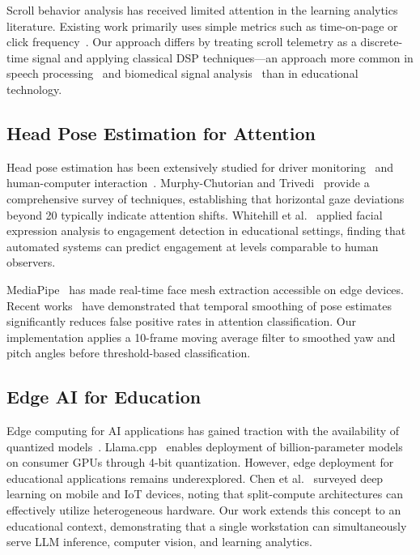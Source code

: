 \documentclass[conference]{IEEEtran}
\begin{document}
Scroll behavior analysis has received limited attention in the learning analytics literature. Existing work primarily uses simple metrics such as time-on-page or click frequency~\cite{romero2010educational}. Our approach differs by treating scroll telemetry as a discrete-time signal and applying classical DSP techniques---an approach more common in speech processing~\cite{rabiner1993} and biomedical signal analysis~\cite{rangayyan2015biomedical} than in educational technology.

\subsection{Head Pose Estimation for Attention}

Head pose estimation has been extensively studied for driver monitoring~\cite{murphy2009head} and human-computer interaction~\cite{baltrusaitis2018openface}. Murphy-Chutorian and Trivedi~\cite{murphy2009head} provide a comprehensive survey of techniques, establishing that horizontal gaze deviations beyond 20\textdegree{} typically indicate attention shifts. Whitehill et al.~\cite{whitehill2014} applied facial expression analysis to engagement detection in educational settings, finding that automated systems can predict engagement at levels comparable to human observers.

MediaPipe~\cite{lugaresi2019mediapipe} has made real-time face mesh extraction accessible on edge devices. Recent works~\cite{sariyanidi2015} have demonstrated that temporal smoothing of pose estimates significantly reduces false positive rates in attention classification. Our implementation applies a 10-frame moving average filter to smoothed yaw and pitch angles before threshold-based classification.

\subsection{Edge AI for Education}

Edge computing for AI applications has gained traction with the availability of quantized models~\cite{dettmers2022gptint, frantar2023gptq}. Llama.cpp~\cite{gerganov2023llamacpp} enables deployment of billion-parameter models on consumer GPUs through 4-bit quantization. However, edge deployment for educational applications remains underexplored. Chen et al.~\cite{chen2019deep} surveyed deep learning on mobile and IoT devices, noting that split-compute architectures can effectively utilize heterogeneous hardware. Our work extends this concept to an educational context, demonstrating that a single workstation can simultaneously serve LLM inference, computer vision, and learning analytics.
\end{document}
